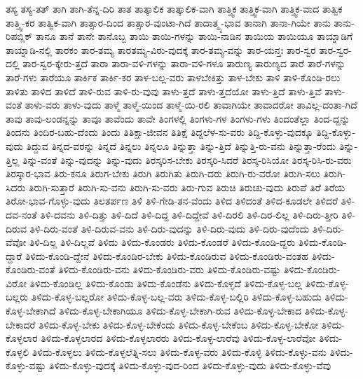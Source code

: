 {ತಸ್ಯ
ತಸ್ಯ-ತತ್
ತಾಗಿ
ತಾಗಿ-ತೆನ್ನ-ದಿರಿ
ತಾತ
ತಾತ್ಕಾಲಿಕ
ತಾತ್ಕಾಲಿಕ-ವಾಗಿ
ತಾತ್ತ್ವಿಕ
ತಾತ್ತ್ವಿಕ-ವಾಗಿ
ತಾತ್ತ್ವಿಕ-ವಾದ
ತಾತ್ವಿಕ
ತಾತ್ತ್ವಿ-ಕರ
ತಾತ್ವಿಕ-ವಾಗಿ
ತಾತ್ಸಾರ-ದಿಂದ
ತಾತ್ಸಾರ-ವುಂಟಾ-ಗಿದೆ
ತಾದಾತ್ಮ್ಯ-ಭಾವ
ತಾನಾಗಿ
ತಾನಾ-ಗಿಯೇ
ತಾನು
ತಾನು-ರಿಪಬ್ಲಿಕ್
ತಾನೂ
ತಾನೆ
ತಾನೇ
ತಾನೊಬ್ಬ
ತಾಯಿ
ತಾಯಿ-ಗಳನ್ನು
ತಾಯಿ-ನಾಡಿನ
ತಾಯಿಯ
ತಾಯಿಯೂ
ತಾಯ್ನಾಡಿಗೆ
ತಾಯ್ನಾಡಿ-ನಲ್ಲಿ
ತಾರಕಂ
ತಾರ-ತಮ್ಯ
ತಾರತಮ್ಯ-ವಿರು-ವುದಕ್ಕೆ
ತಾರ-ತಮ್ಯ-ವನ್ನು
ತಾರ-ಯನ್ತಃ
ತಾರ-ಸ್ವರ
ತಾರ-ಸ್ವರ-ದಲ್ಲಿ
ತಾರ-ಸ್ವರ-ಕ್ಕೇರು-ತ್ತದೆ
ತಾರಾ
ತಾರಾ-ವಳಿ-ಗಳನ್ನು
ತಾರಾ-ವಳಿ-ಗಳೂ
ತಾರುಣ್ಯ
ತಾರುಣ್ಯದ
ತಾರೆ
ತಾರೆ-ಗಳನ್ನು
ತಾರೆ-ಗಳು
ತಾರೆಯೂ
ತಾರ್ಕಿಕ
ತಾರ್ಕಿ-ಕರ
ತಾಳ-ಬಲ್ಲ-ವರು
ತಾಳಬೇಕಿತ್ತು
ತಾಳ-ಬೇಕು
ತಾಳಿ
ತಾಳಿ-ಕೊಂಡಿ-ರಲು
ತಾಳಿತು
ತಾಳಿದ
ತಾಳಿದೆ
ತಾಳಿ-ರುವ
ತಾಳಿ-ರು-ವುವು
ತಾಳು-ತ್ತದೆ
ತಾಳು-ತ್ತದೆಯೋ
ತಾಳು-ತ್ತಿದೆ
ತಾಳು-ತ್ತಿವೆ
ತಾಳು-ವಂತೆ
ತಾಳು-ವರು
ತಾಳು-ವುದು
ತಾಳ್ಮೆ
ತಾಳ್ಮೆ-ಯಿಂದ
ತಾಳ್ಮೆ-ಯಿ-ರಲಿ
ತಾವಾಗಿಯೇ
ತಾವಾದರೋ
ತಾವಿಲ್ಲ-ದಂತಾ-ಗಿದೆ
ತಾವು
ತಾವು-ಲಂಡನ್ನನ್ನು
ತಾವೂ
ತಾವೆಂದು
ತಾವೇ
ತಿಂಗಳಲ್ಲಿ
ತಿಂಗಳು-ಗಳ
ತಿಂಗಳು-ಗಳು
ತಿಂದಂತೆಲ್ಲಾ
ತಿಂದ-ದ್ದನ್ನು
ತಿಂದನು
ತಿಂದಿರ-ಬಹು-ದೆಂದು
ತಿಂದು
ತಿತಿಕ್ಷಾ-ಜೀವನ
ತಿತಿಕ್ಷೆ
ತಿದ್ದಲೆಳ-ಸು-ವರು
ತಿದ್ದಿ-ಕೊಳ್ಳು-ವುದಕ್ಕೂ
ತಿದ್ದಿ-ಕೊಳ್ಳು-ವುದು
ತಿದ್ದುವ
ತಿನ್ನದ-ವರನ್ನು
ತಿನ್ನದೆ
ತಿನ್ನಲು
ತಿನ್ನಲೂ
ತಿನ್ನುತ್ತಾ
ತಿನ್ನು-ತ್ತಿದೆ
ತಿನ್ನುತ್ತಿ-ರು-ವನು
ತಿನ್ನುತ್ತಾ-ರೆಂದು
ತಿನ್ನು-ತ್ತಿಲ್ಲ
ತಿನ್ನು-ವಂತೆ
ತಿನ್ನು-ವುದನ್ನು
ತಿನ್ನು-ವುದು
ತಿರಸ್ಕರಿಸ-ಬೇಕು
ತಿರಸ್ಕರಿ-ಸಿದರೆ
ತಿರಸ್ಕ-ರಿಸಿಯೋ
ತಿರಸ್ಕ-ರಿಸಿ-ರು-ವರು
ತಿರಸ್ಕಾರ-ಭಾವ
ತಿರು-ಕನೂ
ತಿರುಗ-ಬೇಕು
ತಿರುಗಿ
ತಿರುಗಿತು
ತಿರುಗಿ-ದರು
ತಿರುಗಿ-ರು-ವರೋ
ತಿರುಗಿ-ಸಲು
ತಿರುಗಿ-ಸಿದರು
ತಿರುಗಿ-ಸುತ್ತಾರೆ
ತಿರುಗಿ-ಸು-ವನು
ತಿರುಗಿ-ಸು-ವರು
ತಿರು-ಗುವ
ತಿರುಚಿ
ತಿರುಚು-ವುದು
ತಿರುಪೆ
ತಿರೆ
ತಿರೆಯ
ತಿರೋ-ಭಾವ-ಗೊಳ್ಳು-ವುದು
ತಿಲತರ್ಪಣ
ತಿಳಿ
ತಿಳಿ-ಗೇಡಿ-ತನ-ವೆಂದು
ತಿಳಿದ
ತಿಳಿದಂತೆ
ತಿಳಿದ-ಕೂಡಲೇ
ತಿಳಿದರೆ
ತಿಳಿ-ದವ-ನಂತೆ
ತಿಳಿ-ದವನು
ತಿಳಿ-ದಿತ್ತು
ತಿಳಿ-ದಿದೆ
ತಿಳಿ-ದಿದ್ದ
ತಿಳಿ-ದಿದ್ದೇವೆ
ತಿಳಿ-ದಿರಲಿ
ತಿಳಿ-ದಿರ-ಲಿಲ್ಲ
ತಿಳಿ-ದಿರು-ತ್ತೀರಿ
ತಿಳಿ-ದಿರುವ
ತಿಳಿ-ದಿರು-ವಂತೆ
ತಿಳಿ-ದಿರುವ-ವನು
ತಿಳಿ-ದಿರು-ವುದನ್ನು
ತಿಳಿ-ದಿರು-ವುದು
ತಿಳಿ-ದಿರು-ವುದೆಂದು
ತಿಳಿ-ದಿರು-ವೆವೋ
ತಿಳಿ-ದಿಲ್ಲ
ತಿಳಿ-ದಿಲ್ಲವೆ
ತಿಳಿದು
ತಿಳಿದು-ಕೊಂಡರು
ತಿಳಿದು-ಕೊಂಡರೆ
ತಿಳಿದು-ಕೊಂಡಿ-ದ್ದರು
ತಿಳಿದು-ಕೊಂಡಿ-ದ್ದಾರೆ
ತಿಳಿದು-ಕೊಂಡಿ-ದ್ದೇನೆ
ತಿಳಿದು-ಕೊಂಡಿರ-ಬೇಕು
ತಿಳಿದು-ಕೊಂಡಿರುವ
ತಿಳಿದು-ಕೊಂಡಿರು-ವಂತಹ
ತಿಳಿದು-ಕೊಂಡಿರು-ವಂತೆ
ತಿಳಿದು-ಕೊಂಡಿರು-ವನು
ತಿಳಿದು-ಕೊಂಡಿರು-ವರು
ತಿಳಿದು-ಕೊಂಡಿರು-ವಷ್ಟು
ತಿಳಿದು-ಕೊಂಡಿರು-ವಿರೋ
ತಿಳಿದು-ಕೊಂಡಿಲ್ಲ
ತಿಳಿದು-ಕೊಂಡು
ತಿಳಿದು-ಕೊಂಡೆನು
ತಿಳಿದು-ಕೊಳ್ಳದೆ
ತಿಳಿದು-ಕೊಳ್ಳ-ಬಲ್ಲ
ತಿಳಿದು-ಕೊಳ್ಳ-ಬಲ್ಲರು
ತಿಳಿದು-ಕೊಳ್ಳ-ಬಲ್ಲರೋ
ತಿಳಿದು-ಕೊಳ್ಳ-ಬಲ್ಲ-ವರು
ತಿಳಿದು-ಕೊಳ್ಳ-ಬಲ್ಲಿರಿ
ತಿಳಿದು-ಕೊಳ್ಳ-ಬಹುದು
ತಿಳಿದು-ಕೊಳ್ಳ-ಬೇಕಾಗಿದೆ
ತಿಳಿದು-ಕೊಳ್ಳ-ಬೇಕಾಗಿಯೂ
ತಿಳಿದು-ಕೊಳ್ಳ-ಬೇಕಾಗಿ-ರುವ
ತಿಳಿದು-ಕೊಳ್ಳ-ಬೇಕಾದ
ತಿಳಿದು-ಕೊಳ್ಳ-ಬೇಕಾದರೆ
ತಿಳಿದು-ಕೊಳ್ಳ-ಬೇಕು
ತಿಳಿದು-ಕೊಳ್ಳ-ಬೇಕೆಂದು
ತಿಳಿದು-ಕೊಳ್ಳ-ಬೇಕೆಂಬ
ತಿಳಿದು-ಕೊಳ್ಳ-ಬೇಕೋ
ತಿಳಿದು-ಕೊಳ್ಳಲಾರ
ತಿಳಿದು-ಕೊಳ್ಳಲಾರದ
ತಿಳಿದು-ಕೊಳ್ಳಲಾರರು
ತಿಳಿದು-ಕೊಳ್ಳ-ಲಾರೆವು
ತಿಳಿದು-ಕೊಳ್ಳ-ಲಾರೆವೋ
ತಿಳಿದು-ಕೊಳ್ಳಲಿ
ತಿಳಿದು-ಕೊಳ್ಳಲು
ತಿಳಿದು-ಕೊಳ್ಳಲೆತ್ನಿ-ಸಲು
ತಿಳಿದು-ಕೊಳ್ಳ-ವರು
ತಿಳಿದು-ಕೊಳ್ಳಿ
ತಿಳಿದು-ಕೊಳ್ಳು-ವನು
ತಿಳಿದು-ಕೊಳ್ಳು-ವಷ್ಟು
ತಿಳಿದು-ಕೊಳ್ಳು-ವುದಕ್ಕೆ
ತಿಳಿದು-ಕೊಳ್ಳು-ವುದ-ರಿಂದ
ತಿಳಿದು-ಕೊಳ್ಳು-ವುದು
ತಿಳಿದು-ಕೊಳ್ಳು-ವೆವು
}
